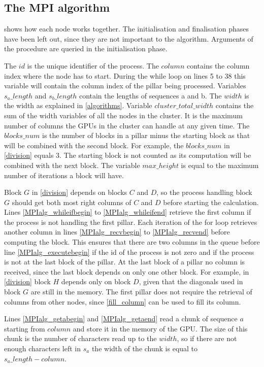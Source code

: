 \subsection{The MPI algorithm}
 shows how each node works together.
The initialisation and finalisation phases have been left out, since they are not important to the algorithm.
Arguments of the procedure are queried in the initialisation phase.

The $id$ is the unique identifier of the process.
The $column$ contains the column index where the node has to start. During the while loop on lines 5 to 38 this variable will contain the column index of the pillar being processed.
Variables $s_a\_length$ and $s_b\_length$ contain the lengths of sequences a and b.
The $width$ is the width as explained in \cref{algorithms}.
Variable $cluster\_total\_width$ contains the sum of the width variables of all the nodes in the cluster.
It is the maximum number of columns the GPUs in the cluster can handle at any given time.
The $blocks\_num$ is the number of blocks in a pillar minus the starting block as that will be combined with the second block.
For example, the $blocks\_num$ in \cref{division} equals $3$.
The starting block is not counted as its computation will be combined with the next block.
The variable $max\_height$ is equal to the maximum number of iterations a block will have.

Block $G$ in \cref{division} depends on blocks $C$ and $D$, so the process handling block $G$ should get both most right columns of $C$ and $D$ before starting the calculation.
Lines \ref{MPIalg_whileifbegin} to \ref{MPIalg_whileifend} retrieve the first column if the process is not handling the first pillar.
Each iteration of the for loop retrieves another column in lines \ref{MPIalg_recvbegin} to \ref{MPIalg_recvend} before computing the block.
This ensures that there are two columns in the queue before line \ref{MPIalg_executebegin} if the id of the process is not zero and if the process is not at the last block of the pillar.
At the last block of a pillar no column is received, since the last block depends on only one other block.
For example, in \cref{division} block $H$ depends only on block $D$, given that the diagonals used in block $G$ are still in the memory.
The first pillar does not require the retrieval of columns from other nodes, since \cref{fill_column} can be used to fill its column.

Lines \ref{MPIalg_getabegin} and \ref{MPIalg_getaend} read a chunk of sequence $a$ starting from $column$ and store it in the memory of the GPU.
The size of this chunk is the number of characters read up to the $width$, so if there are not enough characters left in $s_a$ the width of the chunk is equal to $s_a\_length - column$.


